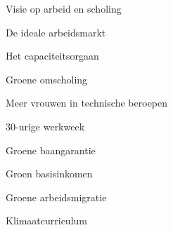 
\begin{visie-concept}{Visie op arbeid en scholing}\end{visie-concept}

\begin{voorstel-concept}{De ideale arbeidsmarkt}\end{voorstel-concept}
\begin{voorstel-concept}{Het capaciteitsorgaan}\end{voorstel-concept}
\begin{voorstel-concept}{Groene omscholing}\end{voorstel-concept}
\begin{voorstel-concept}{Meer vrouwen in technische beroepen}\end{voorstel-concept}
\begin{voorstel-concept}{30-urige werkweek}\end{voorstel-concept}
\begin{voorstel-concept}{Groene baangarantie}\end{voorstel-concept}
\begin{voorstel-concept}{Groen basisinkomen}\end{voorstel-concept}
\begin{voorstel-concept}{Groene arbeidsmigratie}\end{voorstel-concept}
\begin{voorstel-concept}{Klimaatcurriculum}\end{voorstel-concept}
